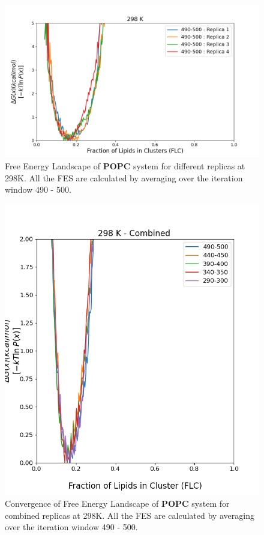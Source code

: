 \documentclass{biophys-new}
\begin{document}



\begin{figure}[hbt!]
\centering
\includegraphics[width=1.1\linewidth]{all_plots/ClusterLipids2Total/DPPC_POPC_CHOL/298K/Average_POPC_298_ClusterLipids2Total.png}
\caption{Free Energy Landscape of \textbf{POPC} system for different replicas at 298K. All the FES are calculated by averaging over the iteration window 490 - 500.}
\label{fig:view}

\end{figure}

\begin{figure}[hbt!]
\centering
\includegraphics[width=0.6\linewidth]{all_plots/ClusterLipids2Total/DPPC_POPC_CHOL/298K/Convergence_POPC_MULTI__298_ClusterLipids2Total.png}
\caption{Convergence of Free Energy Landscape of \textbf{POPC} system for combined replicas at 298K. All the FES are calculated by averaging over the iteration window 490 - 500.}
\label{fig:view}

\end{figure}
\end{document}
